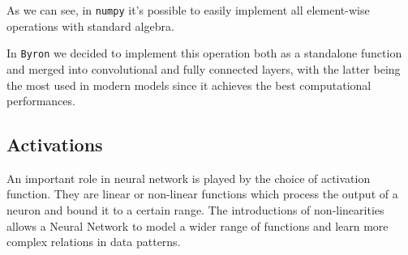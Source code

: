 \documentclass[12pt,a4paper]{report}
\begin{document}
As we can see, in \texttt{numpy} it's possible to easily implement all element-wise operations with standard algebra.

In \texttt{Byron} we decided to implement this operation both as a standalone function and merged into convolutional and fully connected layers, with the latter being the most used in modern models since it achieves the best computational performances.

\subsection*{Activations}

An important role in neural network is played by the choice of activation function. They are linear or non-linear functions which process the output of a neuron and bound it to a certain range.
The introductions of non-linearities allows a Neural Network to model a wider range of functions and learn more complex relations in data patterns.
\end{document}
